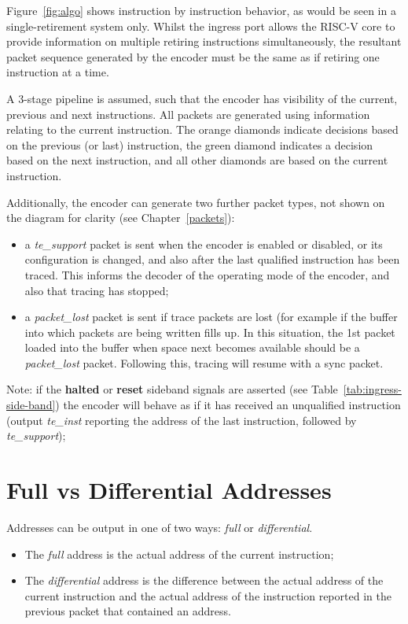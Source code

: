 Figure~\ref{fig:algo} shows instruction by instruction behavior, as would be
seen in a single-retirement system only.  Whilst the ingress port allows the RISC-V core to
provide information on multiple retiring instructions simultaneously, the resultant packet
sequence generated by the encoder must be the same as if retiring one instruction at a time.

A 3-stage pipeline is assumed, such that the encoder has 
visibility of the current, previous and next instructions.  All packets are generated using 
information relating to the current instruction.  The orange diamonds indicate decisions 
based on the previous (or last) instruction, the green diamond indicates a decision based on the
next instruction, and all other diamonds are based on the current instruction.

Additionally, the encoder can generate two further packet types, not shown on the diagram for 
clarity (see Chapter~\ref{packets}):

\begin{itemize}
  \item a \textit{te\_support} packet is sent when the encoder is enabled or disabled, or its
    configuration is changed, and also after the last qualified instruction has been traced.
    This informs the decoder of the operating mode of the encoder, and also that tracing has
    stopped;
  \item a \textit{packet\_lost} packet is sent if trace packets are lost (for example if the 
    buffer into which packets are being written fills up.  In this situation, the 1st packet 
    loaded into the buffer when space next becomes available should be a \textit{packet\_lost} 
    packet.  Following this, tracing will resume with a sync packet.
\end{itemize}

Note: if the \textbf{halted} or \textbf{reset} sideband signals are asserted (see Table~\ref{tab:ingress-side-band})
the encoder will behave as if it has received an unqualified instruction (output \textit{te\_inst}
reporting the address of the last instruction, followed by \textit{te\_support});


\section{Full vs Differential Addresses} \label{addresses}
Addresses can be output in one of two ways: \textit{full} or \textit{differential}.

\begin{itemize}
  \item The \textit{full} address is the actual address of the current instruction;
  \item The \textit{differential} address is the difference between the actual address of 
    the current instruction and the actual address of the instruction reported in the 
    previous packet that contained an address.
\end{itemize}

